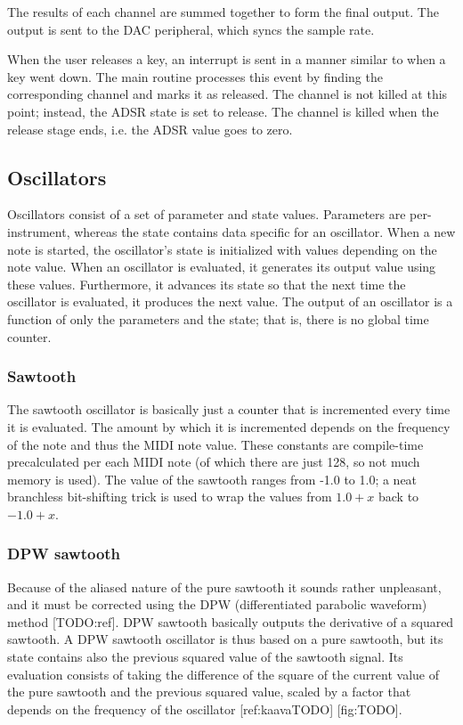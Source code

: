 \documentclass[10pt,a4paper,oneside]{article}
\begin{document}
The results of each channel are summed together to form the final output. The output is sent to the DAC peripheral, which syncs the sample rate.

When the user releases a key, an interrupt is sent in a manner similar to when a key went down. The main routine processes this event by finding the corresponding channel and marks it as released. The channel is not killed at this point; instead, the ADSR state is set to release. The channel is killed when the release stage ends, i.e. the ADSR value goes to zero.

\subsection{Oscillators}

Oscillators consist of a set of parameter and state values. Parameters are per-instrument, whereas the state contains data specific for an oscillator. When a new note is started, the oscillator's state is initialized with values depending on the note value. When an oscillator is evaluated, it generates its output value using these values. Furthermore, it advances its state so that the next time the oscillator is evaluated, it produces the next value. The output of an oscillator is a function of only the parameters and the state; that is, there is no global time counter.

\subsubsection{Sawtooth}

The sawtooth oscillator is basically just a counter that is incremented every time it is evaluated. The amount by which it is incremented depends on the frequency of the note and thus the MIDI note value. These constants are compile-time precalculated per each MIDI note (of which there are just 128, so not much memory is used). The value of the sawtooth ranges from -1.0 to 1.0; a neat branchless bit-shifting trick is used to wrap the values from $1.0+x$ back to $-1.0+x$.

\subsubsection{DPW sawtooth}

Because of the aliased nature of the pure sawtooth it sounds rather unpleasant, and it must be corrected using the DPW (differentiated parabolic waveform) method [TODO:ref]. DPW sawtooth basically outputs the derivative of a squared sawtooth. A DPW sawtooth oscillator is thus based on a pure sawtooth, but its state contains also the previous squared value of the sawtooth signal. Its evaluation consists of taking the difference of the square of the current value of the pure sawtooth and the previous squared value, scaled by a factor that depends on the frequency of the oscillator [ref:kaavaTODO] [fig:TODO].
\end{document}
